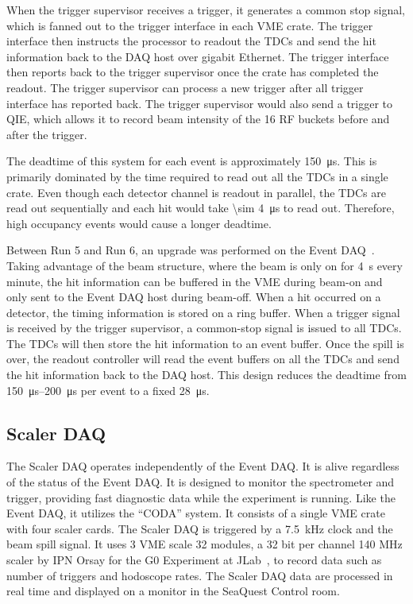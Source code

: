\documentclass[../main.tex]{subfiles}
\begin{document}
When the trigger supervisor receives a trigger, it generates a common stop signal, which is fanned out
to the trigger interface in each VME crate. The trigger interface then instructs the processor to readout the TDCs
and send the hit information back to the DAQ host over gigabit Ethernet. The trigger interface then
reports back to the trigger supervisor once the crate has completed the readout. The trigger supervisor can process
a new trigger after all trigger interface has reported back. The trigger supervisor would also send a trigger to QIE,
which allows it to record beam intensity of the 16 RF buckets before and after the trigger.

The deadtime of this system for each event is approximately \SI{150}{\micro\second}. This is primarily
dominated by the time required to read out all the TDCs in a single crate. Even though
each detector channel is readout in parallel, the TDCs are read out sequentially
and each hit would take \SI{\sim 4}{\micro\second} to read out. Therefore, high occupancy
events would cause a longer deadtime.

Between Run 5 and Run 6, an upgrade was performed on the Event DAQ~\cite{Kun-1724}.
Taking advantage of the beam structure, where the beam is only on for \SI{4}{\s} every minute,
the hit information can be buffered in the VME during beam-on and only sent to the Event
DAQ host during beam-off. When a hit occurred on a detector,
the timing information is stored on a ring buffer.
When a trigger signal is received by the trigger supervisor,
a common-stop signal is issued to all TDCs. The TDCs will then store the hit information
to an event buffer. Once the spill is over, the readout controller will read the event
buffers on all the TDCs and send the hit information back to the DAQ host.
This design reduces the deadtime from \SIrange{150}{200}{\micro\second} per event to a fixed \SI{28}{\micro\second}.

\subsection{Scaler DAQ}
The Scaler DAQ operates independently of the Event DAQ.
It is alive regardless of the status of the Event DAQ.
It is designed to monitor the spectrometer and trigger,
providing fast diagnostic data while the experiment is running. Like the Event DAQ,
it utilizes the ``CODA'' system. It consists of a single VME crate with four scaler
cards. The Scaler DAQ is triggered by a \SI{7.5}{\kilo\hertz} clock and the beam
spill signal. It uses 3 VME scale 32 modules,
a 32 bit per channel 140 MHz scaler by IPN Orsay for the G0 Experiment at JLab~\cite{Scale32},
to record data such as number of triggers
and hodoscope rates. The Scaler DAQ data are processed in real time and displayed
on a monitor in the SeaQuest Control room.
\end{document}
